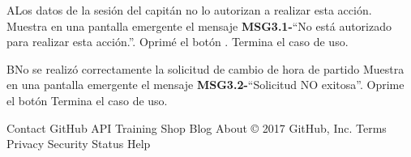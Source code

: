 \begin{UCtrayectoriaA}{A}{Los datos de la sesión del capitán no lo autorizan a realizar esta acción.}
	\UCpaso Muestra en una pantalla emergente el mensaje {\bf MSG3.1-}``No está autorizado para realizar esta acción.''.
	\UCpaso[\UCactor] Oprimé el botón .
	\UCpaso[] Termina el caso de uso.
	\end{UCtrayectoriaA}

	\begin{UCtrayectoriaA}{B}{No se realizó correctamente la solicitud de cambio de hora de partido}
		\UCpaso Muestra en una pantalla emergente el mensaje {\bf MSG3.2-}``Solicitud NO exitosa''.
		\UCpaso[\UCactor] Oprime el botón 
		\UCpaso[] Termina el caso de uso.
	\end{UCtrayectoriaA}
Contact GitHub API Training Shop Blog About
© 2017 GitHub, Inc. Terms Privacy Security Status Help
